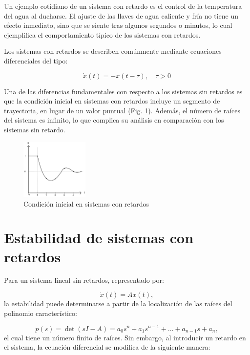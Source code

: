 \documentclass[conference]{IEEEtran}
\begin{document}
Un ejemplo cotidiano de un sistema con retardo es el control de la temperatura del agua al ducharse. El ajuste de las llaves de agua caliente y fría no tiene un efecto inmediato, sino que se siente tras algunos segundos o minutos, lo cual ejemplifica el comportamiento típico de los sistemas con retardos.

Los sistemas con retardos se describen comúnmente mediante ecuaciones diferenciales del tipo:

\begin{equation}
	\dot{x}(t) = -x(t - \tau), \quad \tau > 0
\end{equation}

Una de las diferencias fundamentales con respecto a los sistemas sin retardos es que la condición inicial en sistemas con retardos incluye un segmento de trayectoria, en lugar de un valor puntual (Fig. \ref{fig:ci_retardos}). Además, el número de raíces del sistema es infinito, lo que complica su análisis en comparación con los sistemas sin retardo.

\begin{figure}[h]
	\centering
	\includegraphics[width=0.3\textwidth]{ci.jpeg}
	\caption{Condición inicial en sistemas con retardos}
	\label{fig:ci_retardos}
\end{figure}

\section{Estabilidad de sistemas con retardos}

Para un sistema lineal sin retardos, representado por:

\begin{equation}
	\dot{x}(t) = A x(t),
\end{equation}
la estabilidad puede determinarse a partir de la localización de las raíces del polinomio característico:

\begin{equation}
	p(s) = \det(sI - A) = a_0 s^n + a_1 s^{n-1} + \dots + a_{n-1} s + a_n,
\end{equation}
el cual tiene un número finito de raíces. Sin embargo, al introducir un retardo en el sistema, la ecuación diferencial se modifica de la siguiente manera:
\end{document}
